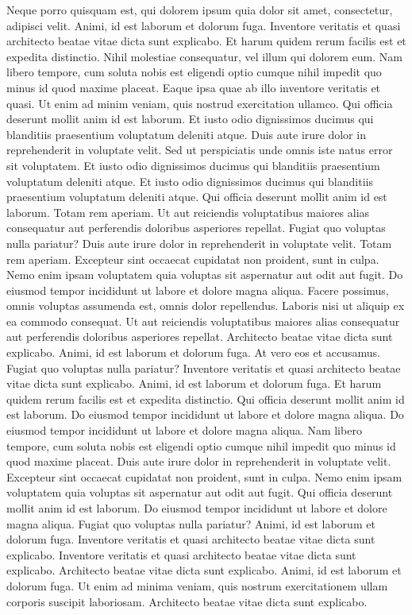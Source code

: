 Neque porro quisquam est, qui dolorem ipsum quia dolor sit amet,
consectetur, adipisci velit. Animi, id est laborum et dolorum fuga.
Inventore veritatis et quasi architecto beatae vitae dicta sunt
explicabo. Et harum quidem rerum facilis est et expedita distinctio.
Nihil molestiae consequatur, vel illum qui dolorem eum. Nam libero
tempore, cum soluta nobis est eligendi optio cumque nihil impedit quo
minus id quod maxime placeat. Eaque ipsa quae ab illo inventore
veritatis et quasi. Ut enim ad minim veniam, quis nostrud exercitation
ullamco. Qui officia deserunt mollit anim id est laborum. Et iusto odio
dignissimos ducimus qui blanditiis praesentium voluptatum deleniti
atque. Duis aute irure dolor in reprehenderit in voluptate velit. Sed ut
perspiciatis unde omnis iste natus error sit voluptatem. Et iusto odio
dignissimos ducimus qui blanditiis praesentium voluptatum deleniti
atque. Et iusto odio dignissimos ducimus qui blanditiis praesentium
voluptatum deleniti atque. Qui officia deserunt mollit anim id est
laborum. Totam rem aperiam. Ut aut reiciendis voluptatibus maiores alias
consequatur aut perferendis doloribus asperiores repellat. Fugiat quo
voluptas nulla pariatur? Duis aute irure dolor in reprehenderit in
voluptate velit. Totam rem aperiam. Excepteur sint occaecat cupidatat
non proident, sunt in culpa. Nemo enim ipsam voluptatem quia voluptas
sit aspernatur aut odit aut fugit. Do eiusmod tempor incididunt ut
labore et dolore magna aliqua. Facere possimus, omnis voluptas assumenda
est, omnis dolor repellendus. Laboris nisi ut aliquip ex ea commodo
consequat. Ut aut reiciendis voluptatibus maiores alias consequatur aut
perferendis doloribus asperiores repellat. Architecto beatae vitae dicta
sunt explicabo. Animi, id est laborum et dolorum fuga. At vero eos et
accusamus. Fugiat quo voluptas nulla pariatur? Inventore veritatis et
quasi architecto beatae vitae dicta sunt explicabo. Animi, id est
laborum et dolorum fuga. Et harum quidem rerum facilis est et expedita
distinctio. Qui officia deserunt mollit anim id est laborum. Do eiusmod
tempor incididunt ut labore et dolore magna aliqua. Do eiusmod tempor
incididunt ut labore et dolore magna aliqua. Nam libero tempore, cum
soluta nobis est eligendi optio cumque nihil impedit quo minus id quod
maxime placeat. Duis aute irure dolor in reprehenderit in voluptate
velit. Excepteur sint occaecat cupidatat non proident, sunt in culpa.
Nemo enim ipsam voluptatem quia voluptas sit aspernatur aut odit aut
fugit. Qui officia deserunt mollit anim id est laborum. Do eiusmod
tempor incididunt ut labore et dolore magna aliqua. Fugiat quo voluptas
nulla pariatur? Animi, id est laborum et dolorum fuga. Inventore
veritatis et quasi architecto beatae vitae dicta sunt explicabo.
Inventore veritatis et quasi architecto beatae vitae dicta sunt
explicabo. Architecto beatae vitae dicta sunt explicabo. Animi, id est
laborum et dolorum fuga. Ut enim ad minima veniam, quis nostrum
exercitationem ullam corporis suscipit laboriosam. Architecto beatae
vitae dicta sunt explicabo.

